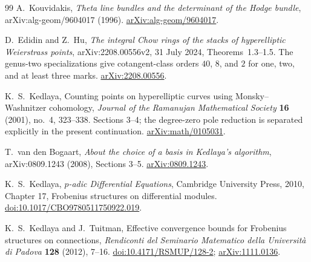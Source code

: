 \documentclass[11pt]{article}
\theoremstyle{definition}
\theoremstyle{remark}
\begin{document}
\begin{thebibliography}{99}
A.~Kouvidakis,
\emph{Theta line bundles and the determinant of the Hodge bundle},
arXiv:alg-geom/9604017 (1996).
\href{https://arxiv.org/abs/alg-geom/9604017}{arXiv:alg-geom/9604017}.

D.~Edidin and Z.~Hu,
\emph{The integral Chow rings of the stacks of hyperelliptic Weierstrass
points}, arXiv:2208.00556v2, 31 July 2024,
Theorems~1.3--1.5. The genus-two specializations give cotangent-class
orders $40$, $8$, and $2$ for one, two, and at least three marks.
\href{https://arxiv.org/abs/2208.00556}{arXiv:2208.00556}.


K.~S.~Kedlaya,
Counting points on hyperelliptic curves using Monsky--Washnitzer cohomology,
\emph{Journal of the Ramanujan Mathematical Society} \textbf{16}
(2001), no.~4, 323--338. Sections 3--4; the degree-zero pole reduction
is separated explicitly in the present continuation.
\href{https://arxiv.org/abs/math/0105031}{arXiv:math/0105031}.

T.~van den Bogaart,
\emph{About the choice of a basis in Kedlaya's algorithm},
arXiv:0809.1243 (2008), Sections 3--5.
\href{https://arxiv.org/abs/0809.1243}{arXiv:0809.1243}.

K.~S.~Kedlaya,
\emph{$p$-adic Differential Equations}, Cambridge University Press,
2010, Chapter 17, Frobenius structures on differential modules.
\href{https://doi.org/10.1017/CBO9780511750922.019}{doi:10.1017/CBO9780511750922.019}.

K.~S.~Kedlaya and J.~Tuitman,
Effective convergence bounds for Frobenius structures on connections,
\emph{Rendiconti del Seminario Matematico della Universit\`a di Padova}
\textbf{128} (2012), 7--16.
\href{https://doi.org/10.4171/RSMUP/128-2}{doi:10.4171/RSMUP/128-2};
\href{https://arxiv.org/abs/1111.0136}{arXiv:1111.0136}.

\end{thebibliography}
\end{document}
